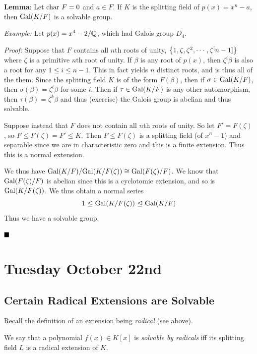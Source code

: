 \textbf{Lemma}: Let \(\mathrm{char}~ F = 0\) and \(a\in F\). If \(K\) is the
splitting field of \(p(x) = x^n-a\), then \(\mathrm{Gal}(K/F)\) is a solvable
group.

\emph{Example:} Let \(p(x) = x^4-2 / {\mathbb{Q}}\), which had Galois group
\(D_4\).

\emph{Proof:} Suppose that \(F\) contains all \(n\)th roots of unity,
\(\left\{{1, \zeta, \zeta^2, \cdots, \zeta^[n-1]}\right\}\) where \(\zeta\) is a
primitive \(n\)th root of unity. If \(\beta\) is any root of \(p(x)\),
then \(\zeta^i\beta\) is also a root for any \(1\leq i \leq n-1\). This
in fact yields \(n\) distinct roots, and is thus all of the them. Since
the splitting field \(K\) is of the form \(F(\beta)\), then if
\(\sigma \in \mathrm{Gal}(K/F)\), then \(\sigma(\beta) = \zeta^i \beta\) for
some \(i\). Then if \(\tau \in \mathrm{Gal}(K/F)\) is any other automorphism,
then \(\tau(\beta) = \zeta^k \beta\) and thus (exercise) the Galois
group is abelian and thus solvable.

Suppose instead that \(F\) does not contain all \(n\)th roots of unity.
So let \(F' = F(\zeta)\), so \(F \leq F(\zeta) = F' \leq K\). Then
\(F \leq F(\zeta)\) is a splitting field (of \(x^n-1\)) and separable
since we are in characteristic zero and this is a finite extension. Thus
this is a normal extension.

We thus have \(\mathrm{Gal}(K/F) / \mathrm{Gal}(K/F(\zeta)) \cong \mathrm{Gal}(F(\zeta)/ F)\).
We know that \(\mathrm{Gal}(F(\zeta)/ F)\) is abelian since this is a cyclotomic
extension, and so is \(\mathrm{Gal}(K/F(\zeta))\). We thus obtain a normal
series \[
1 {~\trianglelefteq~} \mathrm{Gal}(K/F(\zeta)) {~\trianglelefteq~} \mathrm{Gal}(K/F)
\] Thus we have a solvable group.

\(\qed\)

\hypertarget{tuesday-october-22nd}{%
\section{Tuesday October 22nd}\label{tuesday-october-22nd}}

\hypertarget{certain-radical-extensions-are-solvable}{%
\subsection{Certain Radical Extensions are
Solvable}\label{certain-radical-extensions-are-solvable}}

Recall the definition of an extension being \emph{radical} (see above).

We say that a polynomial \(f(x) \in K[x]\) is \emph{solvable by
radicals} iff its splitting field \(L\) is a radical extension of \(K\).

